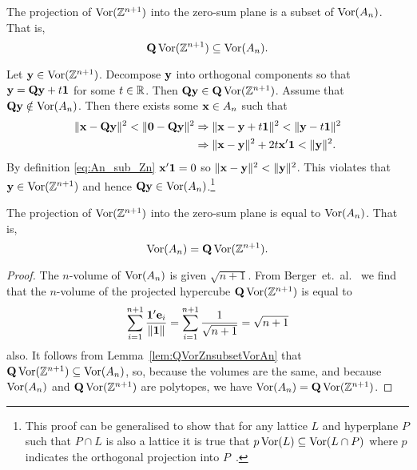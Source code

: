 \documentclass[draftcls, onecolumn, 11pt]{IEEEtran}
\begin{document}
\begin{lemma} \label{lem:QVorZnsubsetVorAn}
The projection of $\operatorname{Vor}({\mathbb Z}^{n+1})$ into the zero-sum plane is a subset of $\operatorname{Vor}(A_{n})$.  That is,
\[
\mathbf{Q}\operatorname{Vor}({\mathbb Z}^{n+1}) \subseteq \operatorname{Vor}(A_{n}).
\]
\end{lemma}
\begin{IEEEproof}
Let $\mathbf{y} \in \operatorname{Vor}({\mathbb Z}^{n+1})$.  Decompose $\mathbf{y}$ into orthogonal components so that $\mathbf{y} = \mathbf{Q} \mathbf{y} + t \boldsymbol{1}$ for some $t \in {\mathbb R}$.  Then $\mathbf{Q}\mathbf{y} \in \mathbf{Q}\operatorname{Vor}({\mathbb Z}^{n+1})$.  Assume that $\mathbf{Q}\mathbf{y} \notin \operatorname{Vor}(A_n)$.  Then there exists some $\mathbf{x} \in A_n$ such that
\begin{align*}
\|\mathbf{x} - \mathbf{Q}\mathbf{y}\|^2 < \|\boldsymbol{0} - \mathbf{Q}\mathbf{y}\|^2 & \Rightarrow \|\mathbf{x} - \mathbf{y} + t\boldsymbol{1}\|^2 < \|\mathbf{y} - t\boldsymbol{1}\|^2 \\
& \Rightarrow \|\mathbf{x} - \mathbf{y}\|^2 + 2t\mathbf{x}'\boldsymbol{1} < \|\mathbf{y}\|^2.
\end{align*}
By definition \eqref{eq:An_sub_Zn} $\mathbf{x}'\boldsymbol{1} = 0$ so $\|\mathbf{x} - \mathbf{y}\|^2 < \|\mathbf{y}\|^2$.  This violates that $\mathbf{y} \in \operatorname{Vor}({\mathbb Z}^{n+1})$ and hence $\mathbf{Q}\mathbf{y} \in \operatorname{Vor}(A_n)$.\footnote{This proof can be generalised to show that for any lattice $L$ and hyperplane $P$ such that $P\cap L$ is also a lattice it is true that $p\operatorname{Vor}(L) \subseteq \operatorname{Vor}(L \cap P)$ where $p$ indicates the orthogonal projection into $P$~\cite[Lemma~2.1]{McKilliam2010thesis}.}
\end{IEEEproof}

\begin{theorem}  \label{thm:VorAn=QVorZn1}
The projection of $\operatorname{Vor}({\mathbb Z}^{n+1})$ into the zero-sum plane is equal to $\operatorname{Vor}(A_{n})$. That is,
\[
\operatorname{Vor}(A_n) = \mathbf{Q}\operatorname{Vor}({\mathbb Z}^{n+1}).
\]
\end{theorem}
\begin{proof}
The $n$-volume of $\operatorname{Vor}(A_n)$ is given $\sqrt{n + 1}$.  From Berger~et.~al.~\cite[Theorem 1.1]{Burger1996} we find that the $n$-volume of the projected hypercube $\mathbf{Q}\operatorname{Vor}({\mathbb Z}^{n+1})$ is equal to 
\[
\sum_{i = 1}^{n+1} \frac{\boldsymbol{1}^\prime \mathbf{e}_i}{\|\boldsymbol{1}\|} =  \sum_{i = 1}^{n+1} \frac{1}{\sqrt{n+1}} = \sqrt{n + 1}
\] 
also. It follows from Lemma~\ref{lem:QVorZnsubsetVorAn} that $\mathbf{Q}\operatorname{Vor}({\mathbb Z}^{n+1}) \subseteq \operatorname{Vor}(A_n)$, so, because the volumes are the same, and because $\operatorname{Vor}(A_n)$ and $\mathbf{Q}\operatorname{Vor}({\mathbb Z}^{n+1})$ are polytopes, we have $\operatorname{Vor}(A_n) = \mathbf{Q}\operatorname{Vor}({\mathbb Z}^{n+1})$.
\end{proof}
\end{document}

